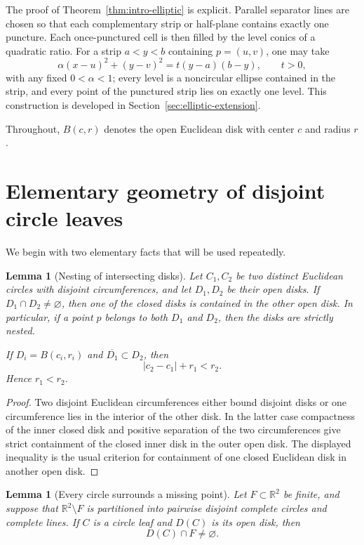 \documentclass[11pt]{article}
\newtheorem{lemma}[theorem]{Lemma}
\newcommand{\R}{\mathbb{R}}
\newcommand{\ol}{\overline}
\begin{document}
The proof of Theorem~\ref{thm:intro-elliptic} is explicit. Parallel separator lines are chosen so that each complementary strip or half-plane contains exactly one puncture. Each once-punctured cell is then filled by the level conics of a quadratic ratio. For a strip $a<y<b$ containing $p=(u,v)$, one may take
\[
\alpha(x-u)^2+(y-v)^2=t(y-a)(b-y),\qquad t>0,
\]
with any fixed $0<\alpha<1$; every level is a noncircular ellipse contained in the strip, and every point of the punctured strip lies on exactly one level. This construction is developed in Section~\ref{sec:elliptic-extension}.

Throughout, $B(c,r)$ denotes the open Euclidean disk with center $c$ and radius $r$.

\section{Elementary geometry of disjoint circle leaves}

We begin with two elementary facts that will be used repeatedly.

\begin{lemma}[Nesting of intersecting disks]\label{lem:nesting}
Let $C_1,C_2$ be two distinct Euclidean circles with disjoint circumferences, and let $D_1,D_2$ be their open disks. If $D_1\cap D_2\neq\varnothing$, then one of the closed disks is contained in the other open disk. In particular, if a point $p$ belongs to both $D_1$ and $D_2$, then the disks are strictly nested.

If $D_i=B(c_i,r_i)$ and $\ol{D_1}\subset D_2$, then
\[
|c_2-c_1|+r_1<r_2.
\]
Hence $r_1<r_2$.
\end{lemma}

\begin{proof}
Two disjoint Euclidean circumferences either bound disjoint disks or one circumference lies in the interior of the other disk. In the latter case compactness of the inner closed disk and positive separation of the two circumferences give strict containment of the closed inner disk in the outer open disk. The displayed inequality is the usual criterion for containment of one closed Euclidean disk in another open disk.
\end{proof}

\begin{lemma}[Every circle surrounds a missing point]\label{lem:puncture-inside}
Let $F\subset\R^2$ be finite, and suppose that $\R^2\setminus F$ is partitioned into pairwise disjoint complete circles and complete lines. If $C$ is a circle leaf and $D(C)$ is its open disk, then
\[
D(C)\cap F\neq\varnothing.
\]
\end{lemma}
\end{document}

